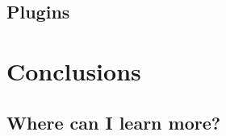 \documentclass[english,compress]{beamer}
\begin{document}
\subsection{Plugins}

\questionframe{}

\section{Conclusions}
\subsection{Where can I learn more?}

\end{document}
